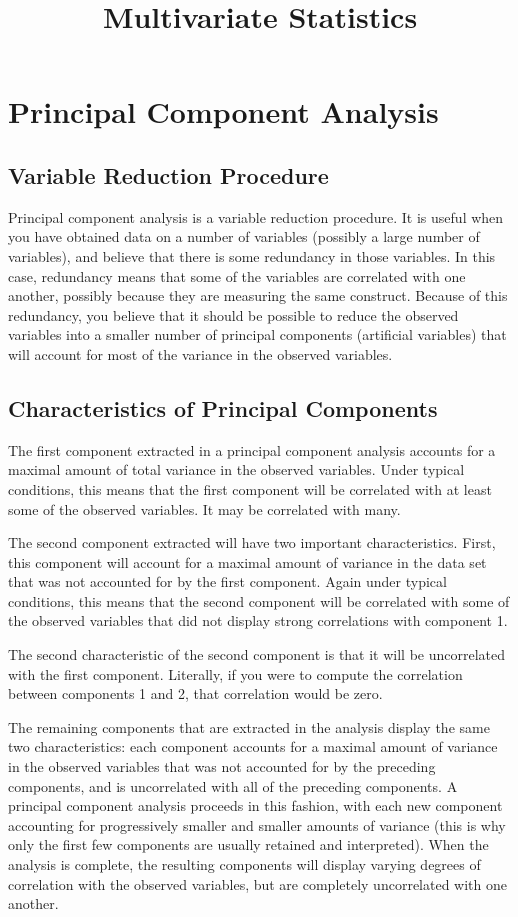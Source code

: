 \documentclass[12pt]{article}
\title{Multivariate Statistics}
\begin{document}
\section*{Principal Component Analysis}

\subsection*{Variable Reduction Procedure}

Principal component analysis is a variable reduction procedure. It is useful when you have
obtained data on a number of variables (possibly a large number of variables), and believe that
there is some redundancy in those variables. In this case, redundancy means that some of the
variables are correlated with one another, possibly because they are measuring the same
construct. Because of this redundancy, you believe that it should be possible to reduce the
observed variables into a smaller number of principal components (artificial variables) that will
account for most of the variance in the observed variables.

\subsection*{Characteristics of Principal Components}
The first component extracted in a principal
component analysis accounts for a maximal amount of total variance in the observed variables.
Under typical conditions, this means that the first component will be correlated with at least
some of the observed variables. It may be correlated with many.

The second component extracted will have two important characteristics. First, this component
will account for a maximal amount of variance in the data set that was not accounted for by the
first component. Again under typical conditions, this means that the second component will be
correlated with some of the observed variables that did not display strong correlations with
component 1.

The second characteristic of the second component is that it will be uncorrelated with the first
component. Literally, if you were to compute the correlation between components 1 and 2, that
correlation would be zero.

The remaining components that are extracted in the analysis display the same two characteristics:
each component accounts for a maximal amount of variance in the observed variables that was
not accounted for by the preceding components, and is uncorrelated with all of the preceding
components. A principal component analysis proceeds in this fashion, with each new component
accounting for progressively smaller and smaller amounts of variance (this is why only the first
few components are usually retained and interpreted). When the analysis is complete, the
resulting components will display varying degrees of correlation with the observed variables, but
are completely uncorrelated with one another.
\end{document}
